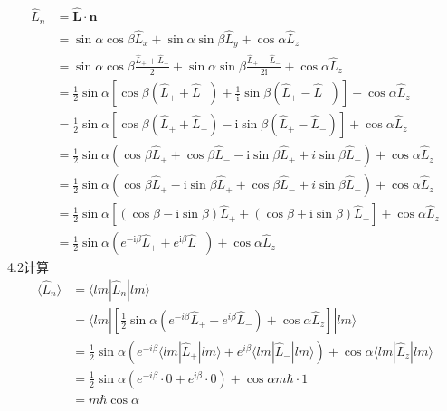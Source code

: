 \begin{equation}
    \begin{aligned}
        \hat{L}_n&=\hat{\boldsymbol{L}}\cdot \boldsymbol{n}
\\
&=\sin \alpha \cos \beta \hat{L}_x+\sin \alpha \sin \beta \hat{L}_y+\cos \alpha \hat{L}_z
\\
&=\sin \alpha \cos \beta \frac{\hat{L}_++\hat{L}_-}{2}+\sin \alpha \sin \beta \frac{\hat{L}_+-\hat{L}_-}{2\mathrm{i}}+\cos \alpha \hat{L}_z
\\
&=\frac{1}{2}\sin \alpha \left[ \cos \beta \left( \hat{L}_++\hat{L}_- \right) +\frac{1}{\mathrm{i}}\sin \beta \left( \hat{L}_+-\hat{L}_- \right) \right] +\cos \alpha \hat{L}_z
\\
&=\frac{1}{2}\sin \alpha \left[ \cos \beta \left( \hat{L}_++\hat{L}_- \right) -\mathrm{i}\sin \beta \left( \hat{L}_+-\hat{L}_- \right) \right] +\cos \alpha \hat{L}_z
\\
&=\frac{1}{2}\sin \alpha \left( \cos \beta \hat{L}_++\cos \beta \hat{L}_--\mathrm{i}\sin \beta \hat{L}_++i\sin \beta \hat{L}_- \right) +\cos \alpha \hat{L}_z
\\
&=\frac{1}{2}\sin \alpha \left( \cos \beta \hat{L}_+-\mathrm{i}\sin \beta \hat{L}_++\cos \beta \hat{L}_-+i\sin \beta \hat{L}_- \right) +\cos \alpha \hat{L}_z
\\
&=\frac{1}{2}\sin \alpha \left[ \left( \cos \beta -\mathrm{i}\sin \beta \right) \hat{L}_++\left( \cos \beta +\mathrm{i}\sin \beta \right) \hat{L}_- \right] +\cos \alpha \hat{L}_z
\\
&=\frac{1}{2}\sin \alpha \left( e^{-\mathrm{i}\beta}\hat{L}_++e^{\mathrm{i}\beta}\hat{L}_- \right) +\cos \alpha \hat{L}_z
    \end{aligned}
\end{equation}
4.2计算
\begin{equation}
    \begin{aligned}
        \langle \hat{L}_n\rangle &=\langle lm|\hat{L}_n|lm\rangle 
\\
&=\langle lm|\left[ \frac{1}{2}\sin \alpha \left( e^{-i\beta}\hat{L}_++e^{i\beta}\hat{L}_- \right) +\cos \alpha \hat{L}_z \right] |lm\rangle 
\\
&=\frac{1}{2}\sin \alpha \left( e^{-i\beta}\langle lm|\hat{L}_+|lm\rangle +e^{i\beta}\langle lm|\hat{L}_-|lm\rangle \right) +\cos \alpha \langle lm|\hat{L}_z|lm\rangle 
\\
&=\frac{1}{2}\sin \alpha \left( e^{-i\beta}\cdot 0+e^{i\beta}\cdot 0 \right) +\cos \alpha m\hbar \cdot 1
\\
&=m\hbar \cos \alpha 
    \end{aligned}
\end{equation}
